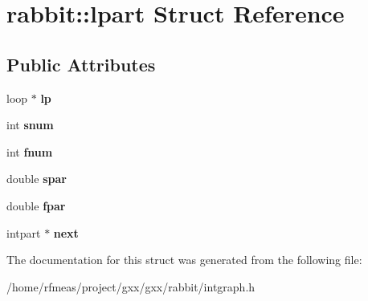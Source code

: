 \hypertarget{structrabbit_1_1lpart}{}\section{rabbit\+:\+:lpart Struct Reference}
\label{structrabbit_1_1lpart}
\subsection*{Public Attributes}
\begin{DoxyCompactItemize}
\item 
loop $\ast$ {\bfseries lp}\hypertarget{structrabbit_1_1lpart_a9da630b9926fbb96919dcfdbd70cde48}{}\label{structrabbit_1_1lpart_a9da630b9926fbb96919dcfdbd70cde48}

\item 
int {\bfseries snum}\hypertarget{structrabbit_1_1lpart_ad756894688d6a5b99489cf049155dc3b}{}\label{structrabbit_1_1lpart_ad756894688d6a5b99489cf049155dc3b}

\item 
int {\bfseries fnum}\hypertarget{structrabbit_1_1lpart_a13889654e8669b12e7a64bf5f0ea16bf}{}\label{structrabbit_1_1lpart_a13889654e8669b12e7a64bf5f0ea16bf}

\item 
double {\bfseries spar}\hypertarget{structrabbit_1_1lpart_aaeb9aa2c2cfa06d9486d2608b91af88c}{}\label{structrabbit_1_1lpart_aaeb9aa2c2cfa06d9486d2608b91af88c}

\item 
double {\bfseries fpar}\hypertarget{structrabbit_1_1lpart_afedd74b4dec1fd8dbf494d2f8a28fc80}{}\label{structrabbit_1_1lpart_afedd74b4dec1fd8dbf494d2f8a28fc80}

\item 
intpart $\ast$ {\bfseries next}\hypertarget{structrabbit_1_1lpart_a31e39da6427f67b180f5340bca6cdb39}{}\label{structrabbit_1_1lpart_a31e39da6427f67b180f5340bca6cdb39}

\end{DoxyCompactItemize}


The documentation for this struct was generated from the following file\+:\begin{DoxyCompactItemize}
\item 
/home/rfmeas/project/gxx/gxx/rabbit/intgraph.\+h\end{DoxyCompactItemize}
